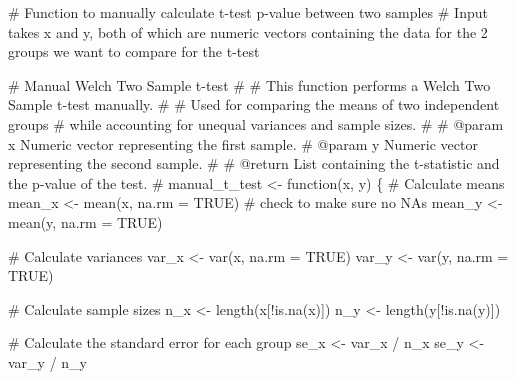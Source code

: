 \documentclass[
  letterpaper,
  DIV=11,
  numbers=noendperiod]{scrartcl}
\newenvironment{Shaded}{\begin{snugshade}}{\end{snugshade}}
\newcommand{\AttributeTok}[1]{\textcolor[rgb]{0.40,0.45,0.13}{#1}}
\newcommand{\CommentTok}[1]{\textcolor[rgb]{0.37,0.37,0.37}{#1}}
\newcommand{\ConstantTok}[1]{\textcolor[rgb]{0.56,0.35,0.01}{#1}}
\newcommand{\ControlFlowTok}[1]{\textcolor[rgb]{0.00,0.23,0.31}{#1}}
\newcommand{\FunctionTok}[1]{\textcolor[rgb]{0.28,0.35,0.67}{#1}}
\newcommand{\NormalTok}[1]{\textcolor[rgb]{0.00,0.23,0.31}{#1}}
\newcommand{\OtherTok}[1]{\textcolor[rgb]{0.00,0.23,0.31}{#1}}
\newcommand{\SpecialCharTok}[1]{\textcolor[rgb]{0.37,0.37,0.37}{#1}}
\begin{document}
\begin{Shaded}
\begin{Highlighting}[]
\CommentTok{\# Function to manually calculate t{-}test p{-}value between two samples}
\CommentTok{\# Input takes x and y, both of which are numeric vectors containing the data for the 2 groups we want to compare for the t{-}test}

\CommentTok{\#\textquotesingle{} Manual Welch Two Sample t{-}test}
\CommentTok{\#\textquotesingle{}}
\CommentTok{\#\textquotesingle{} This function performs a Welch Two Sample t{-}test manually. }
\CommentTok{\#\textquotesingle{} }
\CommentTok{\#\textquotesingle{} Used for comparing the means of two independent groups }
\CommentTok{\#\textquotesingle{} while accounting for unequal variances and sample sizes.}
\CommentTok{\#\textquotesingle{}}
\CommentTok{\#\textquotesingle{} @param x Numeric vector representing the first sample.}
\CommentTok{\#\textquotesingle{} @param y Numeric vector representing the second sample.}
\CommentTok{\#\textquotesingle{}}
\CommentTok{\#\textquotesingle{} @return List containing the t{-}statistic and the p{-}value of the test.}
\CommentTok{\#\textquotesingle{} }
\NormalTok{manual\_t\_test }\OtherTok{\textless{}{-}} \ControlFlowTok{function}\NormalTok{(x, y) \{}
  \CommentTok{\# Calculate means}
\NormalTok{  mean\_x }\OtherTok{\textless{}{-}} \FunctionTok{mean}\NormalTok{(x, }\AttributeTok{na.rm =} \ConstantTok{TRUE}\NormalTok{) }\CommentTok{\# check to make sure no NAs}
\NormalTok{  mean\_y }\OtherTok{\textless{}{-}} \FunctionTok{mean}\NormalTok{(y, }\AttributeTok{na.rm =} \ConstantTok{TRUE}\NormalTok{)}
  
  \CommentTok{\# Calculate variances}
\NormalTok{  var\_x }\OtherTok{\textless{}{-}} \FunctionTok{var}\NormalTok{(x, }\AttributeTok{na.rm =} \ConstantTok{TRUE}\NormalTok{)}
\NormalTok{  var\_y }\OtherTok{\textless{}{-}} \FunctionTok{var}\NormalTok{(y, }\AttributeTok{na.rm =} \ConstantTok{TRUE}\NormalTok{)}
  
  \CommentTok{\# Calculate sample sizes}
\NormalTok{  n\_x }\OtherTok{\textless{}{-}} \FunctionTok{length}\NormalTok{(x[}\SpecialCharTok{!}\FunctionTok{is.na}\NormalTok{(x)])}
\NormalTok{  n\_y }\OtherTok{\textless{}{-}} \FunctionTok{length}\NormalTok{(y[}\SpecialCharTok{!}\FunctionTok{is.na}\NormalTok{(y)])}
  
  \CommentTok{\# Calculate the standard error for each group}
\NormalTok{  se\_x }\OtherTok{\textless{}{-}}\NormalTok{ var\_x }\SpecialCharTok{/}\NormalTok{ n\_x}
\NormalTok{  se\_y }\OtherTok{\textless{}{-}}\NormalTok{ var\_y }\SpecialCharTok{/}\NormalTok{ n\_y}
  

\end{Highlighting}
\end{Shaded}
\end{document}
